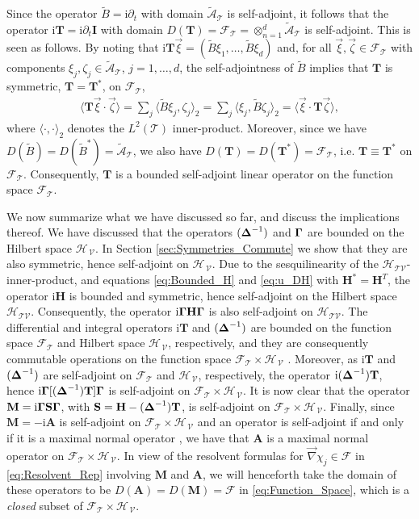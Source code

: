 \documentclass[11pt]{amsart}
\newcommand{\I}{\mathrm{i}}
\newcommand{\Mb}{\mathbf{M}}
\newcommand{\Tb}{\mathbf{T}}
\newcommand{\Hb}{\mathbf{H}}
\newcommand{\Ib}{\mathbf{I}}
\newcommand{\Sb}{\mathbf{S}}
\newcommand{\Ab}{\mathbf{A}}
\newcommand{\Tc}{\mathcal{T}}
\newcommand{\Vc}{\mathcal{V}}
\newcommand{\Hs}{\mathscr{H}}
\newcommand{\As}{\mathscr{A}}
\newcommand{\Fs}{\mathscr{F}}
\newcommand\bDelta{\mbox{\boldmath${\Delta}$}}
\newcommand\bGamma{\mbox{\boldmath${\Gamma}$}}
\begin{document}
Since the operator $\tilde{B}=\I\partial_t$ with domain $\tilde{\As}_{\Tc}$ is
self-adjoint, it follows that the operator $\I\Tb=\I\partial_t\Ib$ with domain
$D(\Tb)=\Fs_{\Tc}=\otimes_{n=1}^d\tilde{\As}_{\Tc}$ is self-adjoint. This is
seen as follows. By noting that
$\I\Tb\vec{\xi}=(\tilde{B}\xi_1,\ldots,\tilde{B}\xi_d)$ and, for all 
$\vec{\xi},\vec{\zeta}\in\Fs_{\Tc}$ with components
$\xi_j,\zeta_j\in\tilde{\As}_{\Tc}$, $j=1,\ldots,d$, the self-adjointness of 
$\tilde{B}$ implies that $\Tb$ is symmetric, $\Tb=\Tb^*$, on $\Fs_{\Tc}$, 
%
\begin{align}\label{eq:T_symmetric}
  \langle\Tb\vec{\xi}\cdot\vec{\zeta}\rangle=\sum_j\langle\tilde{B}\xi_j,\zeta_j\rangle_2
                    =\sum_j\langle\xi_j,\tilde{B}\zeta_j\rangle_2
                    =\langle\vec{\xi}\cdot\Tb\vec{\zeta}\rangle,
\end{align}
%
where $\langle\cdot,\cdot\rangle_2$ denotes the $L^2(\Tc)$ inner-product.  Moreover, since we have
$D(\tilde{B})=D(\tilde{B}^*)=\tilde{\As}_{\Tc}$, we also have
$D(\Tb)=D(\Tb^*)=\Fs_{\Tc}$, i.e. $\Tb\equiv\Tb^*$ on
$\Fs_{\Tc}$. Consequently, $\Tb$ is a bounded self-adjoint linear
operator on the function space $\Fs_{\Tc}$.



We now summarize what we have discussed so far, and
discuss the implications thereof. We have discussed that the 
operators $(\bDelta^{-1})$ and $\bGamma$ are bounded on the Hilbert
space $\Hs_{\,\Vc}$. In Section \ref{sec:Symmetries_Commute} we show
that they are also symmetric, hence self-adjoint on $\Hs_{\,\Vc}$. Due
to the sesquilinearity of the $\Hs_{\Tc\Vc}$-inner-product, and
equations \eqref{eq:Bounded_H} and \eqref{eq:u_DH} with $\Hb^*=\Hb^T$,
the  operator $\I\Hb$ is bounded and symmetric, hence self-adjoint on
the Hilbert space $\Hs_{\Tc\Vc}$.  Consequently, the operator
$\I\bGamma\Hb\bGamma$ is also self-adjoint on $\Hs_{\Tc\Vc}$. The
differential and integral operators $\I\Tb$ and $(\bDelta^{-1})$ are 
bounded on the function space $\Fs_{\Tc}$ and Hilbert space $\Hs_{\,\Vc}$,
respectively, and they are consequently commutable operations on the
function space $\Fs_{\Tc}\times\Hs_{\,\Vc}$ \cite{Folland:99}. Moreover, as
$\I\Tb$ and $(\bDelta^{-1})$ are self-adjoint on
$\Fs_{\Tc}$ and $\Hs_{\,\Vc}$, respectively, the operator 
$\I(\bDelta^{-1})\Tb$, hence $\I\bGamma[(\bDelta^{-1})\Tb]\bGamma$ is
self-adjoint on $\Fs_{\Tc}\times\Hs_{\,\Vc}$. It is now clear that the operator
$\Mb=\I\bGamma\Sb\bGamma$, with $\Sb=\Hb-(\bDelta^{-1})\Tb$, is
self-adjoint on $\Fs_{\Tc}\times\Hs_{\,\Vc}$. Finally, since $\Mb=-\I\Ab$ is
self-adjoint on $\Fs_{\Tc}\times\Hs_{\,\Vc}$ and an operator is
self-adjoint if and only if it is a maximal normal operator
\cite{Stone:64}, we have that $\Ab$ is a maximal normal
operator on $\Fs_{\Tc}\times\Hs_{\,\Vc}$. In view of the resolvent
formulas for $\vec{\nabla}\chi_j\in\Fs$ in \eqref{eq:Resolvent_Rep}
involving $\Mb$ and $\Ab$, we will henceforth take the domain of
these operators to be $D(\Ab)=D(\Mb)=\Fs$ in
\eqref{eq:Function_Space}, which is a \emph{closed} subset of
$\Fs_{\Tc}\times\Hs_{\,\Vc}$.   
\end{document}
